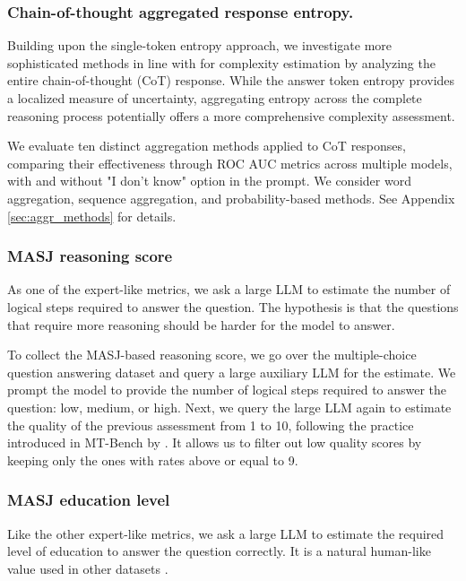 \subsubsection{Chain-of-thought aggregated response entropy.}
Building upon the single-token entropy approach, we investigate more sophisticated methods in line with \citet{fadeeva2023lmpolygraphuncertaintyestimationlanguage} for complexity estimation by analyzing the entire chain-of-thought (CoT) response. 
While the answer token entropy provides a localized measure of uncertainty, aggregating entropy across the complete reasoning process potentially offers a more comprehensive complexity assessment.

We evaluate ten distinct aggregation methods applied to CoT responses, comparing their effectiveness through ROC AUC metrics across multiple models, with and without "I don't know" option in the prompt. 
We consider word aggregation, sequence aggregation, and probability-based methods. See Appendix \ref{sec:aggr_methods} for details.

\subsubsection{MASJ reasoning score}

As one of the expert-like metrics, we ask a large LLM to estimate the number of logical steps required to answer the question. The hypothesis is that the questions that require more reasoning should be harder for the model to answer.

To collect the MASJ-based reasoning score, we go over the multiple-choice question answering dataset and query a large auxiliary LLM for the estimate. We prompt the model to provide the number of logical steps required to answer the question: low, medium, or high. Next, we query the large LLM again to estimate the quality of the previous assessment from 1 to 10, following the practice introduced in MT-Bench by \citet{zheng2023judging}. It allows us to filter out low quality scores by keeping only the ones with rates above or equal to 9.

\subsubsection{MASJ education level}

Like the other expert-like metrics, we ask a large LLM to estimate the required level of education to answer the question correctly. It is a natural human-like value used in other datasets \cite{rein2023gpqagraduatelevelgoogleproofqa, lu2022learn}.

